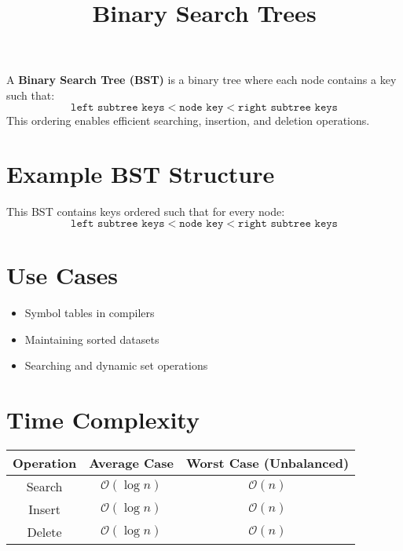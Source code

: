 \documentclass{article}
\title{Binary Search Trees}
\author{}
\date{}
\begin{document}
\maketitle

A \textbf{Binary Search Tree (BST)} is a binary tree where each node contains a key such that:
\[
\texttt{left subtree keys} < \texttt{node key} < \texttt{right subtree keys}
\]
This ordering enables efficient searching, insertion, and deletion operations.

\section{Example BST Structure}

\begin{center}
\end{center}

This BST contains keys ordered such that for every node:
\[
\texttt{left subtree keys} < \texttt{node key} < \texttt{right subtree keys}
\]

\section{Use Cases}
\begin{itemize}
  \item Symbol tables in compilers
  \item Maintaining sorted datasets
  \item Searching and dynamic set operations
\end{itemize}

\section{Time Complexity}

\begin{tabular}{|c|c|c|}
\hline
\textbf{Operation} & \textbf{Average Case} & \textbf{Worst Case (Unbalanced)} \\
\hline
Search & $\mathcal{O}(\log n)$ & $\mathcal{O}(n)$ \\
Insert & $\mathcal{O}(\log n)$ & $\mathcal{O}(n)$ \\
Delete & $\mathcal{O}(\log n)$ & $\mathcal{O}(n)$ \\
\hline
\end{tabular}
\end{document}
